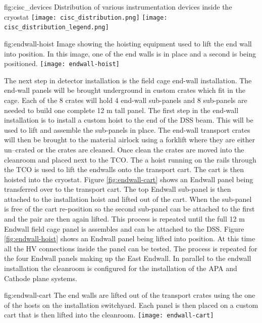 \begin{dunefigure}{fig:cisc_devices}
  {Distribution of various instrumentation devices inside the cryostat}
  \texttt{[image: cisc\_distribution.png]}
  \texttt{[image: cisc\_distribution\_legend.png]}
\end{dunefigure}

\begin{dunefigure}{fig:endwall-hoist}
  {Image showing the hoisting equipment used to lift the end wall into position. In this image, one of the end walls is in place and a second is being positioned.}
\texttt{[image: endwall-hoist]}
\end{dunefigure}

The next step in detector installation is the field cage end-wall installation. 
The end-wall panels will be brought underground in custom crates which fit in the cage. 
Each of the 8 crates will hold 4 end-wall sub-panels and 8 sub-panels are needed to build one complete 12 \si{m} tall panel.  
The first step in the end-wall installation is to install a custom hoist to the end of the DSS beam. 
This will be used to lift and assemble the sub-panels in place. 
The end-wall transport crates will then be brought to the material airlock using a forklift where they are either un--crated or the crates are cleaned. 
Once clean the crates are moved into the cleanroom and placed next to the TCO. The a hoist running on the rails through the TCO is used to lift the endwalls onto the transport cart. The cart is then hoisted into the cryostat. 
Figure \ref{fig:endwall-cart} shows an Endwall panel being transferred over to the transport cart.
The top Endwall sub-panel is then attached to the installation hoist and lifted out of the cart. When the sub-panel is free of  the cart re-position so the second sub-panel can be attached to the first and the pair are then again lifted. This process is repeated until the full 12 \si{m} Endwall field cage panel is assembles and can be attached to the DSS. 
Figure \ref{fig:endwall-hoist} shows an Endwall panel being lifted into position.
At this time all the HV connections inside the panel can be tested. The process is repeated for the four Endwall panels making up the East Endwall. 
In parallel to the endwall installation the cleanroom is configured for the installation of the APA and Cathode plane systems.

\begin{dunefigure}{fig:endwall-cart}
  {The end walls are lifted out of the transport crates using the one of the hosts on the installation switchyard. Each panel is then placed on a custom cart that is then lifted into the cleanroom.}
\texttt{[image: endwall-cart]}
\end{dunefigure}


